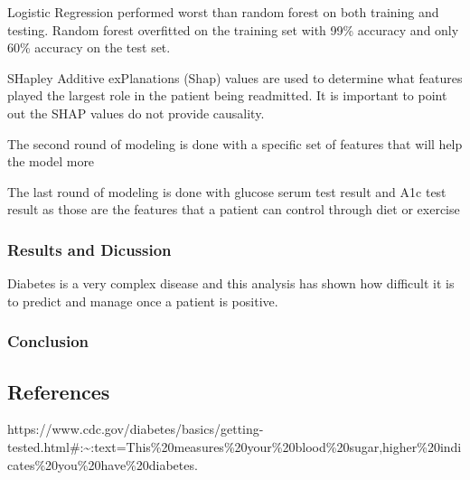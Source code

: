 \documentclass[5p]{elsarticle} %
\begin{document}
Logistic Regression performed worst than random forest on both training
and testing. Random forest overfitted on the training set with 99\%
accuracy and only 60\% accuracy on the test set.

SHapley Additive exPlanations (Shap) values are used to determine what
features played the largest role in the patient being readmitted. It is
important to point out the SHAP values do not provide causality.

The second round of modeling is done with a specific set of features
that will help the model more

The last round of modeling is done with glucose serum test result and
A1c test result as those are the features that a patient can control
through diet or exercise

\hypertarget{results-and-dicussion}{%
\subsubsection{Results and Dicussion}\label{results-and-dicussion}}

Diabetes is a very complex disease and this analysis has shown how
difficult it is to predict and manage once a patient is positive.

\hypertarget{conclusion}{%
\subsubsection{Conclusion}\label{conclusion}}

\hypertarget{references}{%
\subsection{References}\label{references}}

https://www.cdc.gov/diabetes/basics/getting-tested.html\#:\textasciitilde:text=This\%20measures\%20your\%20blood\%20sugar,higher\%20indicates\%20you\%20have\%20diabetes.
\end{document}
